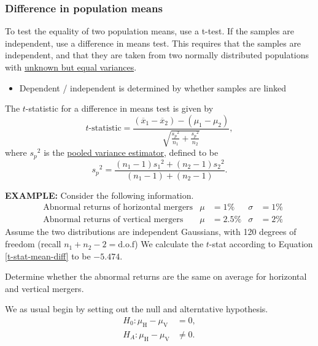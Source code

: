 \documentclass[../notes_compiled.tex]{subfiles}
\begin{document}
\subsubsection{Difference in population means}
\begin{itemize}
\item To test the equality of two population means, use a t-test. If the samples are independent, use a difference in means test. This requires that the samples are independent, and that they are taken from two normally distributed populations with \underline{unknown but equal variances}.
\begin{itemize}
\item[Note:] Dependent / independent is determined by whether samples are linked
\end{itemize}
The $t$-statistic for a difference in means test is given by
\begin{equation}
\text{$t$-statistic} = \frac{(\overline{x}_{1}-\overline{x}_{2})-(\mu_{1}-\mu_{2})}{\sqrt{\frac{{s_{p}}^{2}}{n_{1}}+\frac{{s_{p}}^{2}}{n_{2}}}}, \label{t-stat-mean-diff}
\end{equation}
where ${s_{p}}^{2}$ is the \underline{pooled variance estimator}, defined to be
\begin{equation}
{s_{p}}^{2} = \frac{(n_{1}-1){s_{1}}^{2}+(n_{2}-1){s_{2}}^{2}}{(n_{1}-1)+(n_{2}-1)}.
\end{equation}

{\color{RedViolet}
\item[] \textbf{EXAMPLE:} Consider the following information.
\begin{align*}
&\text{Abnormal returns of horizontal mergers} & \mu&=1\% & \sigma&=1\% \\
&\text{Abnormal returns of vertical mergers} & \mu&=2.5\% & \sigma&=2\%
\end{align*}
Assume the two distributions are independent Gaussians, with 120 degrees of freedom (recall $n_{1} + n_{2} -2 = \mathrm{d.o.f}$) We calculate the $t$-stat according to Equation \ref{t-stat-mean-diff} to be $-5.474$. 

Determine whether the abnormal returns are the same on average for horizontal and vertical mergers.
}

{\color{RoyalBlue}
\item[] We as usual begin by setting out the null and alterntative hypothesis.
\begin{align*}
H_{0}: \mu_{\mathrm{H}} - \mu_{\mathrm{V}} & =0, \\
H_{A}: \mu_{\mathrm{H}} - \mu_{\mathrm{V}} & \neq 0.
\end{align*}

}
\end{itemize}
\end{document}
